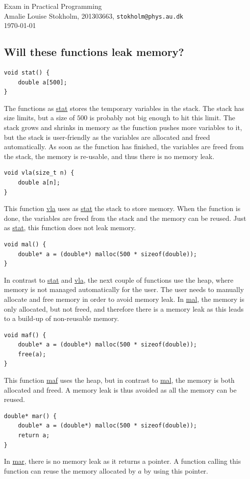 \documentclass[a4paper,oneside,11pt,article]{memoir}
\begin{document}
\begin{center}
  \sffamily
    {\Large Exam in Practical Programming} \\
    \vspace{.8em}
    {Amalie Louise Stokholm, 201303663, \texttt{stokholm@phys.au.dk}} \\
  {\today}
\end{center}
\subsection*{Will these functions leak memory?}
\begin{lstlisting}
void stat() {
	double a[500];
}
\end{lstlisting}
The functions as \url{stat} stores the temporary variables in the stack. The stack has size limits, but a size of $500$ is probably not big enough to hit this limit. The stack grows and shrinks in memory as the function pushes more variables to it, but the stack is user-friendly as the variables are allocated and freed automatically. As soon as the function has finished, the variables are freed from the stack, the memory is re-usable, and thus there is no memory leak.
\begin{lstlisting}
void vla(size_t n) {
	double a[n];
}
\end{lstlisting}
This function \url{vla} uses as \url{stat} the stack to store memory. When the function is done, the variables are freed from the stack and the memory can be reused. Just as \url{stat}, this function does not leak memory.
\begin{lstlisting}
void mal() {
	double* a = (double*) malloc(500 * sizeof(double));
}
\end{lstlisting}
In contrast to \url{stat} and \url{vla}, the next couple of functions use the heap, where memory is not managed automatically for the user. The user needs to manually allocate and free memory in order to avoid memory leak. In \url{mal}, the memory is only allocated, but not freed, and therefore there is a memory leak as this leads to a build-up of non-reusable memory.
\begin{lstlisting}
void maf() {
	double* a = (double*) malloc(500 * sizeof(double));
	free(a);
}
\end{lstlisting}
This function \url{maf} uses the heap, but in contrast to \url{mal}, the memory is both allocated and freed. A memory leak is thus avoided as all the memory can be reused.
\begin{lstlisting}
double* mar() {
	double* a = (double*) malloc(500 * sizeof(double));
	return a;
}
\end{lstlisting}
In \url{mar}, there is no memory leak as it returns a pointer. A function calling this function can reuse the memory allocated by $a$ by using this pointer.
\end{document}
